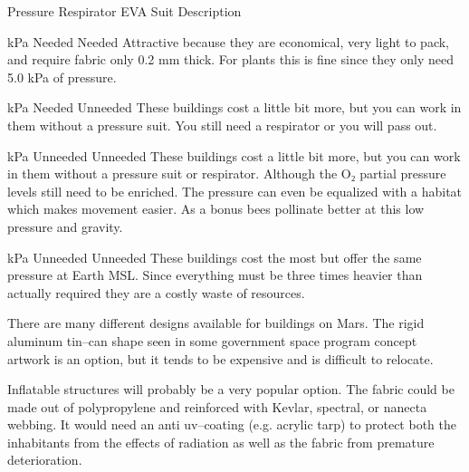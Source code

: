 \crlf
\crlf
{}
{
    \bTABLE[split=repeat,option=stretch]
    \setupTABLE[column][4][
        align=yes]
    \setupTABLE[row][each][align=center]
    \setupTABLE[4][1][align=center]

    \bTABLEhead
    \bTR[bottomframe=on]
      \bTH  Pressure \eTH
      \bTH  Respirator \eTH
      \bTH  EVA Suit \eTH
      \bTH  Description \eTH
    \eTR
    \eTABLEhead

    \bTABLEbody
    \bTR
       kPa \eTC
      \bTC Needed \eTC
      \bTC Needed \eTC
      \bTC Attractive because they are economical, very light to pack, and require fabric only 0.2 mm thick. For plants this is fine since they only need 5.0 kPa of pressure. \eTC
    \eTR

    \bTR
       kPa \eTC
      \bTC Needed \eTC
      \bTC Unneeded \eTC
      \bTC These buildings cost a little bit more, but you can work in them without a pressure suit. You still need a respirator or you will pass out. \eTC
    \eTR

    \bTR
       kPa \eTC
      \bTC Unneeded \eTC
      \bTC Unneeded \eTC
      \bTC These buildings cost a little bit more, but you can work in them without a pressure suit or respirator. Although the O₂ partial pressure levels still need to be enriched. The pressure can even be equalized with a habitat which makes movement easier. As a bonus bees pollinate better at this low pressure and gravity. \eTC
    \eTR

    \bTR
       kPa \eTC
      \bTC Unneeded \eTC
      \bTC Unneeded \eTC
      \bTC These buildings cost the most but offer the same pressure at Earth MSL. Since everything must be three times heavier than actually required they are a costly waste of resources. \eTC
    \eTR
    \eTABLEbody

\eTABLE
}

There are many different designs available for buildings on Mars. The rigid aluminum tin--can shape seen in some government space program concept artwork is an option, but it tends to be expensive and is difficult to relocate.

Inflatable structures will probably be a very popular option. The fabric could be made out of polypropylene and reinforced with Kevlar, spectral, or nanecta webbing. It would need an anti uv--coating (e.g. acrylic tarp) to protect both the inhabitants from the effects of radiation as well as the fabric from premature deterioration.

